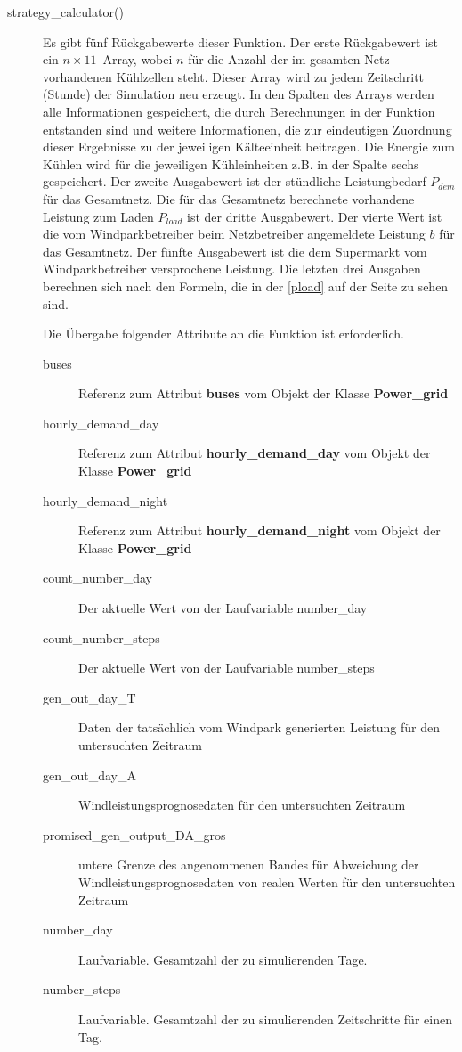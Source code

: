 \begin{description}
\item[strategy\_calculator()] Es gibt f\"unf R\"uckgabewerte dieser Funktion.
Der erste R\"uckgabewert ist ein $n\times11\,$-Array, wobei $n$ f\"ur die Anzahl
der im gesamten Netz vorhandenen K\"uhlzellen steht. Dieser Array wird zu jedem
Zeitschritt (Stunde) der Simulation neu erzeugt. In den Spalten des Arrays
werden alle Informationen gespeichert, die durch Berechnungen in der Funktion
entstanden sind und weitere Informationen, die zur eindeutigen Zuordnung dieser
Ergebnisse zu der jeweiligen K\"alteeinheit beitragen. Die Energie zum K\"uhlen
wird f\"ur die jeweiligen K\"uhleinheiten z.B. in der Spalte sechs gespeichert.
Der zweite Ausgabewert ist der st\"undliche Leistungbedarf $P_{dem}$ f\"ur das
Gesamtnetz.  Die f\"ur das Gesamtnetz berechnete vorhandene Leistung zum Laden
$P_{load}$ ist der dritte Ausgabewert. Der vierte Wert ist die vom
Windparkbetreiber beim Netzbetreiber angemeldete Leistung $b$ f\"ur das
Gesamtnetz. Der f\"unfte Ausgabewert ist die dem Supermarkt vom
Windparkbetreiber versprochene Leistung.  Die letzten drei Ausgaben berechnen
sich nach den Formeln, die in der \cref{pload} auf der Seite \pageref{pload} zu
sehen sind.

Die \"Ubergabe folgender Attribute an die Funktion ist erforderlich.

\begin{description} 
\item[buses] Referenz zum Attribut \textbf{buses} vom Objekt der Klasse
\textbf{Power\_grid}
\item[hourly\_demand\_day] Referenz zum Attribut \textbf{hourly\_demand\_day}
vom Objekt der Klasse \textbf{Power\_grid}
\item[hourly\_demand\_night] Referenz zum Attribut
\textbf{hourly\_demand\_night} vom Objekt der Klasse \textbf{Power\_grid}
\item[count\_number\_day] Der aktuelle Wert von der Laufvariable number\_day
\item[count\_number\_steps] Der aktuelle Wert von der Laufvariable number\_steps
\item[gen\_out\_day\_T] Daten der tats\"achlich vom Windpark generierten
Leistung f\"ur den untersuchten Zeitraum
\item[gen\_out\_day\_A] Windleistungsprognosedaten f\"ur den untersuchten Zeitraum
\item[promised\_gen\_output\_DA\_gros] untere Grenze des angenommenen Bandes
f\"ur Abweichung der Windleistungsprognosedaten von realen Werten f\"ur den
untersuchten Zeitraum
\item[number\_day] Laufvariable. Gesamtzahl der zu simulierenden Tage.
\item[number\_steps] Laufvariable. Gesamtzahl der zu simulierenden Zeitschritte
f\"ur einen Tag.  \end{description}

\end{description}

